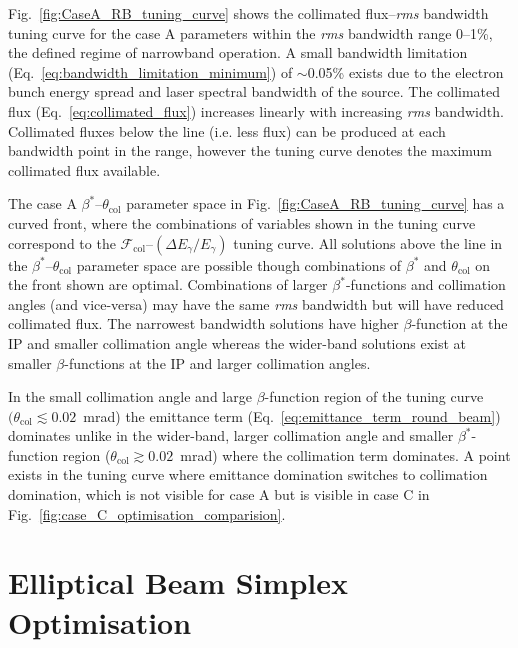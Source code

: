 \documentclass[../main.tex]{subfiles}
\begin{document}
Fig.~\ref{fig:CaseA_RB_tuning_curve} shows the collimated flux--\textit{rms} bandwidth tuning curve for the case A parameters within the \textit{rms} bandwidth range 0--1\%, the defined regime of narrowband operation. A small bandwidth limitation (Eq.~\ref{eq:bandwidth_limitation_minimum}) of $\sim$0.05\% exists due to the electron bunch energy spread and laser spectral bandwidth of the source. The collimated flux (Eq.~\ref{eq:collimated_flux}) increases linearly with increasing \textit{rms} bandwidth. Collimated fluxes below the line (i.e. less flux) can be produced at each bandwidth point in the range, however the tuning curve denotes the maximum collimated flux available. 

The case A $\beta^{*}$--$\theta_{\mathrm{col}}$ parameter space in Fig.~\ref{fig:CaseA_RB_tuning_curve} has a curved front, where the combinations of variables shown in the tuning curve correspond to the $\mathcal{F}_{\mathrm{col}}$--$\left(\Delta E_{\gamma}/E_{\gamma}\right)$ tuning curve. All solutions above the line in the $\beta^{*}$--$\theta_{\mathrm{col}}$ parameter space are possible though combinations of $\beta^{*}$ and $\theta_{\mathrm{col}}$ on the front shown are optimal. Combinations of larger $\beta^{*}$-functions and collimation angles (and vice-versa) may have the same \textit{rms} bandwidth but will have reduced collimated flux. The narrowest bandwidth solutions have higher $\beta$-function at the IP and smaller collimation angle whereas the wider-band solutions exist at smaller $\beta$-functions at the IP and larger collimation angles. 

In the small collimation angle and large $\beta$-function region of the tuning curve $(\theta_{\mathrm{col}}\lesssim 0.02$~\si{\milli\radian}) the emittance term (Eq.~\ref{eq:emittance_term_round_beam}) dominates unlike in the wider-band, larger collimation angle and smaller $\beta^{*}$-function region ($\theta_\mathrm{col} \gtrsim 0.02$~\si{\milli\radian}) where the collimation term dominates. A point exists in the tuning curve where emittance domination switches to collimation domination, which is not visible for case A but is visible in case C in Fig.~\ref{fig:case_C_optimisation_comparision}. 

\section{Elliptical Beam Simplex Optimisation}
\label{sec:EB_optimisation}
\end{document}
